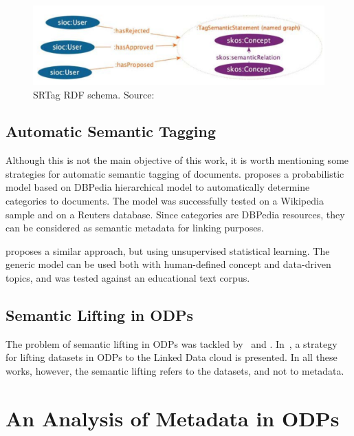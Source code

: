 \begin{figure}[h]
\begin{center}
\includegraphics[width=\columnwidth]{images/SRTag.png}
\caption[SRTag RDF schema.]{SRTag RDF schema. Source: }
\label{fig:srtag}
\end{center}
\end{figure}

\subsection{Automatic Semantic Tagging}
\label{sec:automatic_semtags}
Although this is not the main objective of this work, it is worth mentioning some strategies for automatic semantic tagging of documents.
 proposes a probabilistic model based on DBPedia hierarchical model to automatically determine categories to documents.
The model was successfully tested on a Wikipedia sample and on a Reuters database.
Since categories are DBPedia resources, they can be considered as semantic metadata for linking purposes.

 proposes a similar approach, but using unsupervised statistical learning.
The generic model can be used both with human-defined concept and data-driven topics, and was tested against an educational text corpus.

\subsection{Semantic Lifting in ODPs}
The problem of semantic lifting in ODPs was tackled by~ and . 
In~, a strategy for lifting datasets in ODPs to the Linked Data cloud is presented. 
In all these works, however, the semantic lifting refers to the datasets, and not to metadata.

\section{An Analysis of Metadata in ODPs}
\label{sec:analysis} 

